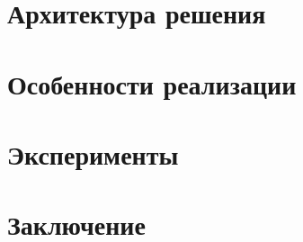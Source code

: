 \section{Архитектура решения}


\section{Особенности реализации}


\section{Эксперименты}


\section*{Заключение}


\setmonofont[Mapping=tex-text]{CMU Typewriter Text}



